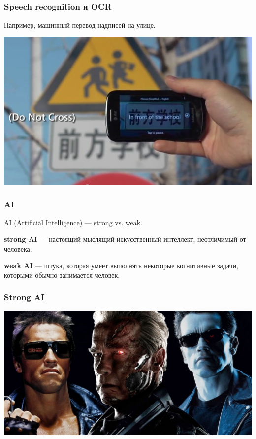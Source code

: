 \documentclass[10pt, compress]{beamer}
\begin{document}
\begin{frame}[fragile]
  \frametitle{Speech recognition и OCR}
  Например, машинный перевод надписей на улице.
  
  \includegraphics[width=\textwidth]{images/ocr-translator}
\end{frame}

\begin{frame}
  \frametitle{AI}
  AI (Artificial Intelligence) --- strong vs. weak.
  
  \textbf{strong AI} --- настоящий мыслящий искусственный интеллект, неотличимый от человека.
  
  \textbf{weak AI} --- штука, которая умеет выполнять некоторые когнитивные задачи, которыми обычно занимается человек.
\end{frame}

\begin{frame}
  \frametitle{Strong AI}
  \begin{center}
  \includegraphics[width=\linewidth]{images/Terminator.jpg}
  \end{center}
\end{frame}
\end{document}
